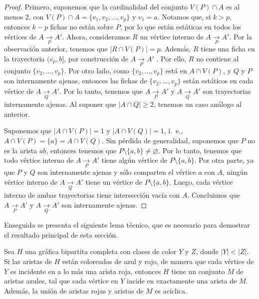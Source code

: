 \begin{proof}
    Primero, suponemos que la cardinalidad del conjunto $V(P) \cap A$ es al
    menos $2$, con $V(P) \cap A = \{v_{1}, v_{2}, \dots, v_{p}\}$ y $v_{1} = a$.
    Notamos que, si $k > p$, entonces $k-p$ fichas no est\'an sobre $P$, por lo
    que est\'an est\'aticas en todos los v\'ertices de $A \xrightarrow[P]{} A'$.
    Ahora, consideramos $R$ un v\'ertice interno de $A \xrightarrow[P]{} A'$.
    Por la observaci\'on anterior, tenemos que  $|R \cap V(P)| = p$. Adem\'as,
    $R$ tiene una ficha en la trayectoria $(v_{p},b ]$, por construcci\'on de $A
    \xrightarrow[P]{} A'$ . Por ello, $R$ no contiene al conjunto $\{v_{2},
    \dots, v_{p}\}$. Por otro lado, como $\{v_{2}, \dots, v_{p}\}$ est\'a en $A
    \cap V(P)$, y $Q$ y $P$ son internamente ajenas, entonces las fichas de
    $\{v_{2}, \dots, v_{p}\}$ est\'an est\'aticos en cada v\'ertice de $A
    \xrightarrow[Q]{} A'$. Por lo tanto, tenemos que $A \xrightarrow[P]{} A'$ y
    $A \xrightarrow[Q]{}A'$ son trayectorias internamente ajenas. Al suponer que
    $|A \cap Q| \geq 2$, tenemos un caso an\'alogo al anterior.

    Suponemos que $|A \cap V(P)| = 1$ y $|A \cap V(Q)| = 1$, i.~e., $A \cap V(P)
    = \{a\} = A \cap V(Q)$. Sin p\'erdida de generalidad, suponemos que $P$ no
    es la arista $ab$, entonces tenemos que $P \setminus \{a,b\} \neq
    \varnothing$. Por lo tanto, tenemos que todo v\'ertice interno de $A
    \xrightarrow[P]{} A'$ tiene alg\'un v\'ertice de $P \setminus \{a, b\}$. Por
    otra parte, ya que $P$ y $Q$ son internamente ajenas y s\'olo comparten el
    v\'ertice $a$ con $A$, ning\'un v\'ertice interno de $A \xrightarrow[Q]{}
    A'$ tiene un v\'ertice de $P \setminus \{a, b\}$. Luego, cada v\'ertice
    interno de ambas trayectorias tiene intersecci\'on vac\'ia con $A$.
    Concluimos que $A \xrightarrow[P]{} A'$ y $A \xrightarrow[Q]{} A'$ son
    internamente ajenas.
\end{proof}

Enseguida se presenta el siguiente lema t\'ecnico, que es necesario para
demostrar el resultado principal de esta secci\'on. 

\begin{lema}%
\label{lem:rb-bipGraph}
    Sea $H$ una gr\'afica bipartita completa con clases de color $Y$ y $Z$,
    donde $|Y|<|Z|$. Si las aristas de $H$ est\'an coloreadas de azul y rojo, de
    manera que cada v\'ertice de $Y$ es incidente en a lo m\'as una arista roja,
    entonces $H$ tiene un conjunto $M$ de aristas azules, tal que cada v\'ertice
    en $Y$ incide en exactamente una arista de $M$. Adem\'as, la uni\'on de
    aristas rojas y aristas de $M$ es ac\'iclica.
\end{lema}

